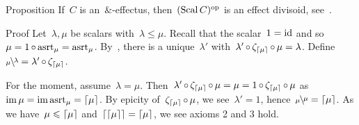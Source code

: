 \documentclass[b]{subfiles}
\begin{document}
\begin{parsec}%
\begin{point}{Proposition}%
If~$C$ is an~$\&$-effectus,
    then~$(\operatorname{Scal} C)^{\mathrm{op}}$ is an effect divisoid,
    see~.
\begin{point}{Proof}%
Let~$\lambda,\mu$ be scalars with~$\lambda \leq \mu$.
Recall that the scalar~$1=\operatorname{id}$
    and so~$\mu = 1 \mathop{\circ} \mathrm{asrt}_\mu = \mathrm{asrt}_\mu$.
By~,
    there is a unique~$\lambda'$
    with~$\lambda' \mathop{\circ} \zeta_{\left\lceil\mu\right\rceil} \mathop{\circ} \mu = \lambda$.
Define~$\rfrac{\lambda}{\mu} = \lambda'  \after \zeta_{\ceil{\mu}}$.

For the moment, assume~$\lambda = \mu$.
Then~$\lambda' \mathop{\circ} \zeta_{\left\lceil\mu\right\rceil} \mathop{\circ} \mu
            = \mu = 1 \mathop{\circ} \zeta_{\left\lceil\mu\right\rceil} \mathop{\circ} \mu$
            as~$\operatorname{im} \mu = \operatorname{im} \mathrm{asrt}_{\mu} = \left\lceil\mu\right\rceil$.
        By epicity of~$\zeta_{\left\lceil\mu\right\rceil} \mathop{\circ} \mu$,
            we see~$\lambda' = 1$, hence~$\rfrac{\mu}{\mu}=\ceil{\mu}$.
As we have~$\mu \leqslant \left\lceil\mu\right\rceil$ and~$\left\lceil\left\lceil\mu\right\rceil\right\rceil = \left\lceil\mu\right\rceil$,
    we see axioms 2 and 3 hold.


\end{point}
\end{point}
\end{parsec}
\end{document}
